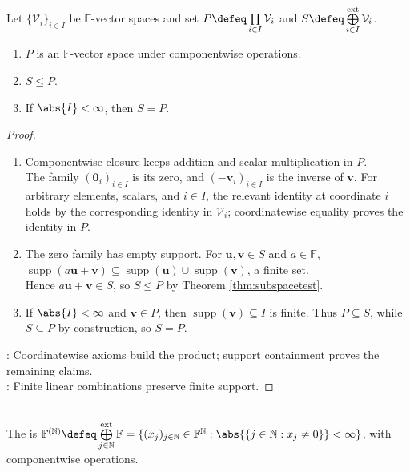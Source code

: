 \begin{proposition} \label{prop:external-direct-sum-family-vector-space} \\
Let $\{\mathcal{V}_i\}_{i\in I}$ be $\mathbb{F}$-vector spaces and set $P\defeq\prod\limits_{i\in I}\mathcal{V}_i$ and $S\defeq\bigoplus\limits_{i\in I}^{\mathrm{ext}}\mathcal{V}_i$.
\begin{enumerate}[label=(\roman*)]
\setlength{\itemsep}{0pt}
\item $P$ is an $\mathbb{F}$-vector space under componentwise operations.
\item $S\leq P$.
\item If $\abs{I}<\infty$, then $S=P$.
\end{enumerate}
\begin{proof}
\begin{enumerate}[label=(\roman*)]
\setlength{\itemsep}{0pt}
\item Componentwise closure keeps addition and scalar multiplication in $P$.\\
The family $(\mathbf{0}_i)_{i\in I}$ is its zero, and $(-\mathbf{v}_i)_{i\in I}$ is the inverse of $\mathbf{v}$. For arbitrary elements, scalars, and $i\in I$, the relevant identity at coordinate $i$ holds by the corresponding identity in $\mathcal{V}_i$; coordinatewise equality proves the identity in $P$.
\item The zero family has empty support. For $\mathbf{u},\mathbf{v}\in S$ and $a\in\mathbb{F}$, $\operatorname{supp}(a\mathbf{u}+\mathbf{v})\subseteq\operatorname{supp}(\mathbf{u})\cup\operatorname{supp}(\mathbf{v})$, a finite set.\\
Hence $a\mathbf{u}+\mathbf{v}\in S$, so $S\leq P$ by Theorem \ref{thm:subspacetest}.
\item If $\abs{I}<\infty$ and $\mathbf{v}\in P$, then $\operatorname{supp}(\mathbf{v})\subseteq I$ is finite. Thus $P\subseteq S$, while $S\subseteq P$ by construction, so $S=P$.
\end{enumerate}
: Coordinatewise axioms build the product; support containment proves the remaining claims.\\
: Finite linear combinations preserve finite support.
\end{proof}
\end{proposition}

\begin{definition} \label{def:finitely-nonzero-sequence-space} \\
\leanok The  is $\mathbb{F}^{(\mathbb{N})}\defeq\bigoplus\limits_{j\in\mathbb{N}}^{\mathrm{ext}}\mathbb{F}=\{(x_j)_{j\in\mathbb{N}}\in\mathbb{F}^{\mathbb{N}}:\abs{\{j\in\mathbb{N}:x_j\neq0\}}<\infty\}$, with componentwise operations.
\end{definition}

